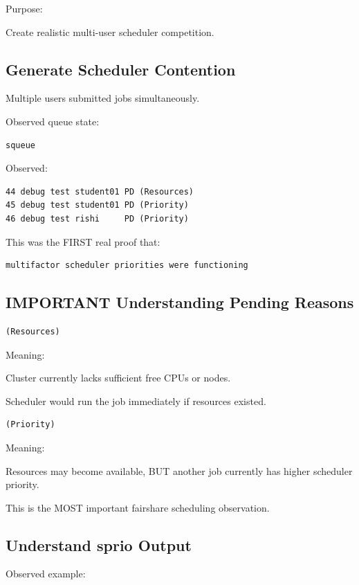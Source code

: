 \documentclass[11pt]{article}
\begin{document}
Purpose:

Create realistic multi-user scheduler competition.
\subsection{Generate Scheduler Contention}
\label{sec:org3a39594}

Multiple users submitted jobs simultaneously.

Observed queue state:

\begin{verbatim}
squeue
\end{verbatim}

Observed:

\begin{verbatim}
44 debug test student01 PD (Resources)
45 debug test student01 PD (Priority)
46 debug test rishi     PD (Priority)
\end{verbatim}

This was the FIRST real proof that:

\begin{verbatim}
multifactor scheduler priorities were functioning
\end{verbatim}
\subsection{IMPORTANT Understanding Pending Reasons}
\label{sec:org0187889}

\begin{verbatim}
(Resources)
\end{verbatim}

Meaning:

Cluster currently lacks sufficient free CPUs or nodes.

Scheduler would run the job immediately if resources existed.

\begin{verbatim}
(Priority)
\end{verbatim}

Meaning:

Resources may become available, BUT another job currently has higher
scheduler priority.

This is the MOST important fairshare scheduling observation.
\subsection{Understand sprio Output}
\label{sec:org6d69578}

Observed example:
\end{document}
